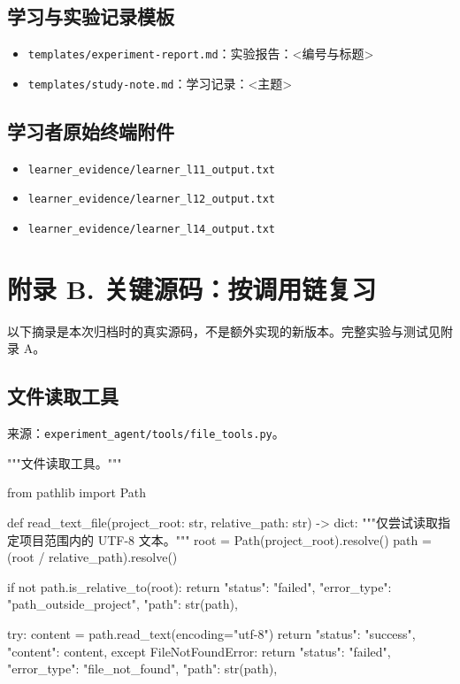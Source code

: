 \documentclass[UTF8,zihao=-4,fontset=fandol]{ctexart}
\begin{document}
\subsection{学习与实验记录模板}
\begin{itemize}
\item \nolinkurl{templates/experiment-report.md}：实验报告：<编号与标题>
\item \nolinkurl{templates/study-note.md}：学习记录：<主题>
\end{itemize}

\subsection{学习者原始终端附件}
\begin{itemize}
\item \nolinkurl{learner_evidence/learner_l11_output.txt}
\item \nolinkurl{learner_evidence/learner_l12_output.txt}
\item \nolinkurl{learner_evidence/learner_l14_output.txt}
\end{itemize}

\section{附录 B. 关键源码：按调用链复习}
以下摘录是本次归档时的真实源码，不是额外实现的新版本。完整实验与测试见附录 A。

\subsection{文件读取工具}

来源：\nolinkurl{experiment_agent/tools/file_tools.py}。

\begin{Code}
"""文件读取工具。"""

from pathlib import Path


def read_text_file(project_root: str, relative_path: str) -> dict:
    """仅尝试读取指定项目范围内的 UTF-8 文本。"""
    root = Path(project_root).resolve()
    path = (root / relative_path).resolve()

    if not path.is_relative_to(root):
        return {
            "status": "failed",
            "error_type": "path_outside_project",
            "path": str(path),
        }

    try:
        content = path.read_text(encoding="utf-8")
        return {
            "status": "success",
            "content": content,
        }
    except FileNotFoundError:
        return {
            "status": "failed",
            "error_type": "file_not_found",
            "path": str(path),
        }
\end{Code}
\end{document}
